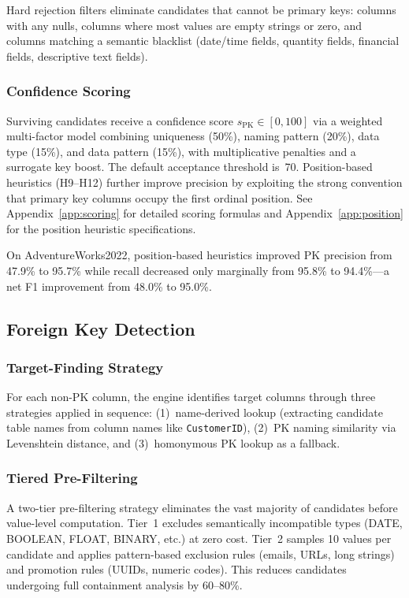 \documentclass[twocolumn]{svjour3}
\begin{document}
Hard rejection filters eliminate candidates that cannot be primary keys: columns with any nulls, columns where most values are empty strings or zero, and columns matching a semantic blacklist (date/time fields, quantity fields, financial fields, descriptive text fields).

\subsubsection{Confidence Scoring}

Surviving candidates receive a confidence score $s_{\mathrm{PK}} \in [0, 100]$ via a weighted multi-factor model combining uniqueness (50\%), naming pattern (20\%), data type (15\%), and data pattern (15\%), with multiplicative penalties and a surrogate key boost. The default acceptance threshold is~70. Position-based heuristics (H9--H12) further improve precision by exploiting the strong convention that primary key columns occupy the first ordinal position. See Appendix~\ref{app:scoring} for detailed scoring formulas and Appendix~\ref{app:position} for the position heuristic specifications.

On AdventureWorks2022, position-based heuristics improved PK precision from 47.9\% to 95.7\% while recall decreased only marginally from 95.8\% to 94.4\%---a net F1 improvement from 48.0\% to 95.0\%.

\subsection{Foreign Key Detection}

\subsubsection{Target-Finding Strategy}

For each non-PK column, the engine identifies target columns through three strategies applied in sequence: (1)~name-derived lookup (extracting candidate table names from column names like \texttt{CustomerID}), (2)~PK naming similarity via Levenshtein distance, and (3)~homonymous PK lookup as a fallback.

\subsubsection{Tiered Pre-Filtering}

A two-tier pre-filtering strategy eliminates the vast majority of candidates before value-level computation. Tier~1 excludes semantically incompatible types (DATE, BOOLEAN, FLOAT, BINARY, etc.) at zero cost. Tier~2 samples 10 values per candidate and applies pattern-based exclusion rules (emails, URLs, long strings) and promotion rules (UUIDs, numeric codes). This reduces candidates undergoing full containment analysis by 60--80\%.
\end{document}
